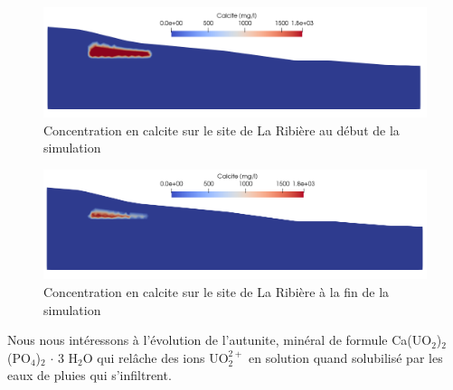 \documentclass{article}
\begin{document}
\begin{figure}[H]
    \centering
    \includegraphics[width=\linewidth]{LJ-Calcite-initial-concentration.PNG}
    \caption{Concentration en calcite sur le site de La Ribière au début de la simulation}
    \label{fig:concentration_calcite_initial}
\end{figure}

\begin{figure}[H]
    \centering
    \includegraphics[width=\linewidth]{LJ-Calcite-final-concentration.PNG}
    \caption{Concentration en calcite sur le site de La Ribière à la fin de la simulation}
    \label{fig:concentration_calcite_final}
\end{figure}
\newpage
Nous nous intéressons à l'évolution de l'autunite, minéral de formule Ca(UO$_2$)$_2$(PO$_4$)$_2$ $\cdot$ 3 H$_2$O qui relâche des ions UO$_2^{2+}$ en solution quand solubilisé par les eaux de pluies qui s'infiltrent.
\end{document}
